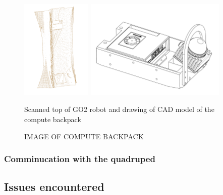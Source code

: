 \documentclass[11pt]{article}
\begin{document}
        \begin{figure}[H]
            \centering
            \includegraphics[width=0.3\textwidth]{Images/ScanGO2Top.pdf}
            \includegraphics[width=0.6\textwidth]{Images/ComputeBackpack.pdf}
            \caption{Scanned top of GO2 robot and drawing of CAD model of the compute backpack }
            \label{fig:scanner_and_cad}
        \end{figure}




        \begin{figure}[H]
            \centering
            \color{red}
            IMAGE OF COMPUTE BACKPACK
        \end{figure}


        
        \subsubsection{Comminucation with the quadruped}

        
    \subsection{Issues encountered}
        
\end{document}
